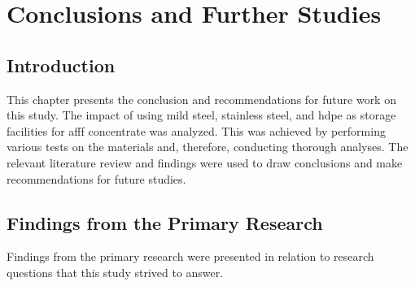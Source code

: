 \chapter{Conclusions and Further Studies}
\label{ch6:anchor:chapter}
\section{Introduction}
This chapter presents the conclusion and recommendations for future work on this study. The impact of using mild steel, stainless steel, and \acrshort{hdpe} as storage facilities for \acrshort{afff} concentrate was analyzed. This was achieved by performing various tests on the materials and, therefore, conducting thorough analyses. The relevant literature review and findings were used to draw conclusions and make recommendations for future studies.

\section{Findings from the Primary Research}
Findings from the primary research were presented in relation to research questions that this study strived to answer.

